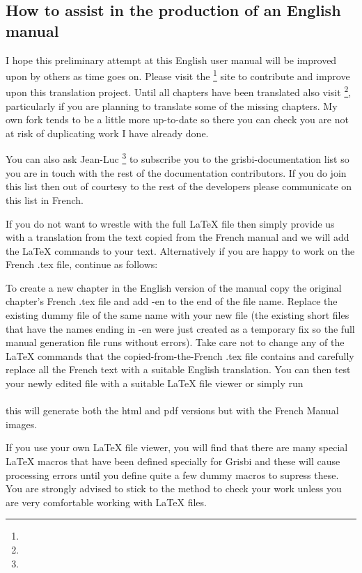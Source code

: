 \subsection*{How to assist in the production of an English manual}

I hope this preliminary attempt at this English user manual will be improved upon by others as time goes on. Please visit the \footnote{\urlGitDoc{}} site to contribute and improve upon this translation project. Until all chapters have been translated also visit  \footnote{\urlBobDoc{}}, particularly if you are planning to translate some of the missing chapters.  My own fork tends to be a little more up-to-date so there you can check you are not at risk of duplicating work I have already done.

You can also ask {Jean-Luc }\footnote{\urlJeanLucDuflotEmail{}} to subscribe you to the grisbi-documentation list so you are in touch with the rest of the documentation contributors. If you do join this list then out of courtesy to the rest of the developers please communicate on this list in French.  

If you do not want to wrestle with the full \LaTeX{} file then simply provide us with a translation from the text copied from the French manual and we will add the  \LaTeX{} commands to your text. Alternatively if you are happy to work on the French .tex file, continue as follows:

To create a new chapter in the English version of the manual copy the original chapter's French .tex file and add -en to the end of the file name.  Replace the existing dummy file of the same name with your new file (the existing short files that have the names ending in -en were just created as a temporary fix so the full manual generation  file runs without errors).  Take care not to change any of the \LaTeX{} commands that the copied-from-the-French .tex file contains and carefully replace all the French text with a suitable English translation.  You can then test your newly edited file with a suitable \LaTeX{} file viewer or simply run 
\\
\\this will generate both the html and pdf versions but with the French Manual images.

 If you use your own \LaTeX{} file viewer, you will find that there are many special \LaTeX{} macros that have been defined specially for Grisbi and these will cause processing errors until you define quite a few dummy macros to supress these. You are strongly advised to stick to the  method to check your work unless you are very comfortable working with \LaTeX{} files.

